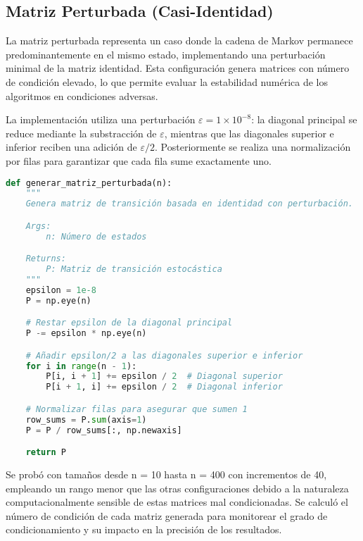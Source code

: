 \subsection{Matriz Perturbada (Casi-Identidad)}

La matriz perturbada representa un caso donde la cadena de Markov permanece predominantemente en el mismo estado, implementando una perturbación minimal de la matriz identidad. Esta configuración genera matrices con número de condición elevado, lo que permite evaluar la estabilidad numérica de los algoritmos en condiciones adversas.

La implementación utiliza una perturbación $\varepsilon = 1 \times 10^{-8}$: la diagonal principal se reduce mediante la substracción de $\varepsilon$, mientras que las diagonales superior e inferior reciben una adición de $\varepsilon/2$. Posteriormente se realiza una normalización por filas para garantizar que cada fila sume exactamente uno.

\begin{lstlisting}[language=Python]
def generar_matriz_perturbada(n):
    """
    Genera matriz de transición basada en identidad con perturbación.

    Args:
        n: Número de estados

    Returns:
        P: Matriz de transición estocástica
    """
    epsilon = 1e-8
    P = np.eye(n)

    # Restar epsilon de la diagonal principal
    P -= epsilon * np.eye(n)

    # Añadir epsilon/2 a las diagonales superior e inferior
    for i in range(n - 1):
        P[i, i + 1] += epsilon / 2  # Diagonal superior
        P[i + 1, i] += epsilon / 2  # Diagonal inferior

    # Normalizar filas para asegurar que sumen 1
    row_sums = P.sum(axis=1)
    P = P / row_sums[:, np.newaxis]

    return P
\end{lstlisting}

Se probó con tamaños desde n = 10 hasta n = 400 con incrementos de 40, empleando un rango menor que las otras configuraciones debido a la naturaleza computacionalmente sensible de estas matrices mal condicionadas. Se calculó el número de condición de cada matriz generada para monitorear el grado de condicionamiento y su impacto en la precisión de los resultados.
